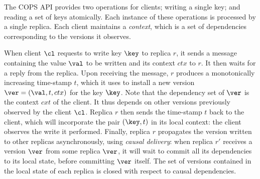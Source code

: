 The COPS API provides two operations for  clients; writing a single
key; and reading 
a set of keys atomically. Each instance of these operations is processed by a single replica. 
Each client maintains a \emph{context}, which is a set of dependencies
corresponding to the versions it observes.  

When client $\cl$ requests to write key $\key$ to replica $r$, it
sends a message containing the value $\val$ to be written and its
context $ctx$ to $r$. It then waits for a reply from the replica. 
Upon receiving the message, $r$ produces a monotonically increasing time-stamp $t$, which it uses to install a new version $\ver = (\val, t, ctx)$ for the key $\key$. 
Note that the dependency set of $\ver$ is the context $cxt$ of the client.
It thus  depends on other versions previously observed by the client $\cl$. 
Replica $r$ then sends the time-stamp $t$ back to the client, which will incorporate the pair $(\key, t)$ in its local context: 
the client observes the write it performed. Finally, replica $r$ propagates the version written to other replicas asynchronously, 
using \emph{causal delivery}: when replica $r'$ receives a version $\ver$ from some replica $\ver$, it 
will wait to commit all its dependencies to its local state, before committing $\ver$ itself.
The set of versions contained in the local state of each replica is closed with respect to causal dependencies.
